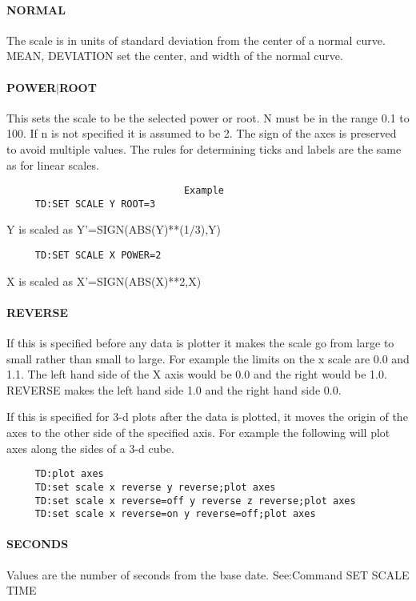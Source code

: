 \paragraph{NORMAL    }
The  scale  is  in  units  of standard deviation from the center of a
normal curve.  MEAN, DEVIATION set  the  center,  and  width  of  the
normal curve.  
\paragraph{POWER$|$ROOT}
This  sets  the scale to be the selected power or root.  N must be in
the range 0.1 to 100.  If n is not specified it is assumed to  be  2.
The  sign  of  the  axes  is preserved to avoid multiple values.  The
rules for determining ticks and labels are the  same  as  for  linear
scales.  

\begin{verbatim}
                               Example
     TD:SET SCALE Y ROOT=3 
\end{verbatim}
Y is scaled as Y'=SIGN(ABS(Y)**(1/3),Y) 
\begin{verbatim}
     TD:SET SCALE X POWER=2 
\end{verbatim}
X is scaled as X'=SIGN(ABS(X)**2,X) 
\paragraph{REVERSE   }
If this is specified before any data is plotter it makes the scale go
from large to small rather than small  to  large.   For  example  the
limits  on  the x scale are 0.0 and 1.1.  The left hand side of the X
axis would be 0.0 and the right would be 1.0.  REVERSE makes the left
hand side 1.0 and the right hand side 0.0.  

If  this  is  specified  for  3-d plots after the data is plotted, it
moves the origin of the axes to the other side of the specified axis.
For  example  the  following  will plot axes along the sides of a 3-d
cube.  
\begin{verbatim}
     TD:plot axes 
     TD:set scale x reverse y reverse;plot axes 
     TD:set scale x reverse=off y reverse z reverse;plot axes 
     TD:set scale x reverse=on y reverse=off;plot axes 
\end{verbatim}
\paragraph{SECONDS   }
Values   are   the   number   of   seconds   from   the   base  date.
See:Command SET SCALE TIME 
